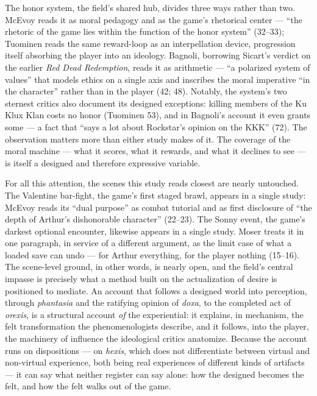 The honor system, the field's shared hub, divides three ways rather than two. McEvoy reads it as moral pedagogy and as the game's rhetorical center --- ``the rhetoric of the game lies within the function of the honor system'' (32--33); Tuominen reads the same reward-loop as an interpellation device, progression itself absorbing the player into an ideology. Bagnoli, borrowing Sicart's verdict on the earlier \textit{Red Dead Redemption}, reads it as arithmetic --- ``a polarized system of values'' that models ethics on a single axis and inscribes the moral imperative ``in the character'' rather than in the player (42; 48). %
Notably, the system's two sternest critics also document its designed exceptions: killing members of the Ku Klux Klan costs no honor (Tuominen 53), and in Bagnoli's account it even grants some --- a fact that ``says a lot about Rockstar's opinion on the KKK'' (72). The observation matters more than either study makes of it. The coverage of the moral machine --- what it scores, what it rewards, and what it declines to see --- is itself a designed and therefore expressive variable. %

For all this attention, the scenes this study reads closest are nearly untouched. The Valentine bar-fight, the game's first staged brawl, appears in a single study: McEvoy reads its ``dual purpose'' as combat tutorial and as first disclosure of ``the depth of Arthur's dishonorable character'' (22--23). The Sonny event, the game's darkest optional encounter, likewise appears in a single study. Moser treats it in one paragraph, in service of a different argument, as the limit case of what a loaded save can undo --- for Arthur everything, for the player nothing (15--16). %
The scene-level ground, in other words, is nearly open, and the field's central impasse is precisely what a method built on the actualization of desire is positioned to mediate. An account that follows a designed world into perception, through \textit{phantasia} and the ratifying opinion of \textit{doxa}, to the completed act of \textit{orexis}, is a structural account \textit{of} the experiential: it explains, in mechanism, the felt transformation the phenomenologists describe, and it follows, into the player, the machinery of influence the ideological critics anatomize. Because the account runs on dispositions --- on \textit{hexis}, which does not differentiate between virtual and non-virtual experience, both being real experiences of different kinds of artifacts --- it can say what neither register can say alone: how the designed becomes the felt, and how the felt walks out of the game.

